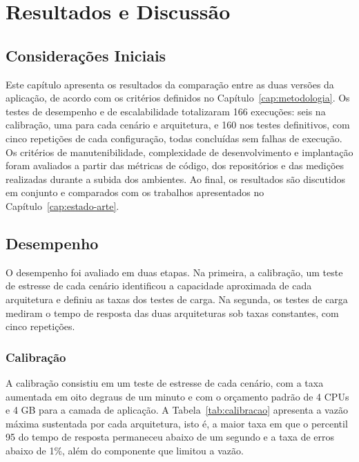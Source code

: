 \chapter{Resultados e Discussão}
\label{cap:resultados}

\section{Considerações Iniciais}

Este capítulo apresenta os resultados da comparação entre as duas versões da aplicação, de
acordo com os critérios definidos no Capítulo~\ref{cap:metodologia}. Os testes de desempenho e
de escalabilidade totalizaram 166 execuções: seis na calibração, uma para cada cenário e
arquitetura, e 160 nos testes definitivos, com cinco repetições de cada configuração, todas
concluídas sem falhas de execução. Os critérios de manutenibilidade, complexidade de
desenvolvimento e implantação foram avaliados a partir das métricas de código, dos repositórios
e das medições realizadas durante a subida dos ambientes. Ao final, os resultados são
discutidos em conjunto e comparados com os trabalhos apresentados no
Capítulo~\ref{cap:estado-arte}.

\section{Desempenho}

O desempenho foi avaliado em duas etapas. Na primeira, a calibração, um teste de estresse de
cada cenário identificou a capacidade aproximada de cada arquitetura e definiu as taxas dos
testes de carga. Na segunda, os testes de carga mediram o tempo de resposta das duas
arquiteturas sob taxas constantes, com cinco repetições.

\subsection{Calibração}

A calibração consistiu em um teste de estresse de cada cenário, com a taxa aumentada em oito
degraus de um minuto e com o orçamento padrão de 4 CPUs e 4 GB para a camada de aplicação. A
Tabela~\ref{tab:calibracao} apresenta a vazão máxima sustentada por cada arquitetura, isto é, a
maior taxa em que o percentil 95 do tempo de resposta permaneceu abaixo de um segundo e a taxa
de erros abaixo de 1\%, além do componente que limitou a vazão.

